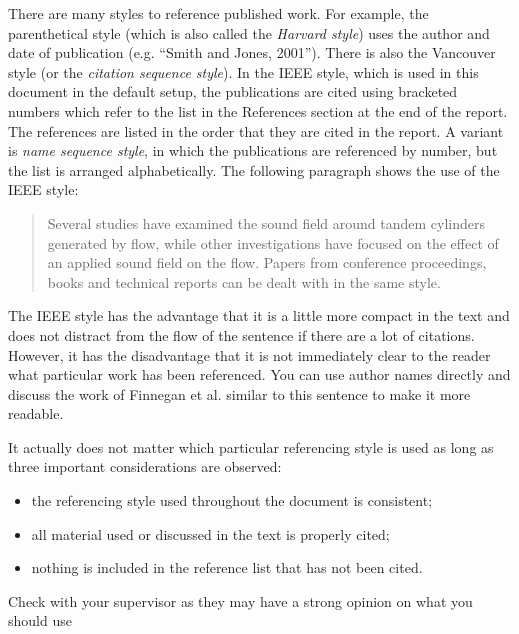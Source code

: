 There are many styles to reference published work. For example, the parenthetical style (which is also called the \emph{Harvard style}) uses the author and date of publication (e.g. ``Smith and Jones, 2001''). There is also the Vancouver style (or the \emph{citation sequence style}). In the IEEE style, which is used in this document in the default setup, the publications are cited using bracketed numbers which refer to the list in the References section at the end of the report. The references are listed in the order that they are cited in the report. A variant is \emph{name sequence style}, in which the publications are referenced by number, but the list is arranged alphabetically. The following paragraph shows the use of the IEEE style: 

\begin{quote}
Several studies have examined the sound field around tandem cylinders generated by flow\cite{fitzpatrick2003flow,finnegan2010experimental}, while other investigations have focused on the effect of an applied sound field on the flow\cite{hall2003vortex}. Papers from conference proceedings\cite{jordan2001array}, books\cite{paidoussis2010fluid} and technical reports\cite{reyes2007power} can be dealt with in the same style.
\end{quote}

The IEEE style has the advantage that it is a little more compact in the text and does not distract from the flow of the sentence if there are a lot of citations. However, it has the disadvantage that it is not immediately clear to the reader what particular work has been referenced. You can use author names directly and discuss the work of Finnegan et al. \cite{finnegan2010experimental} similar to this sentence to make it more readable. 

It actually does not matter which particular referencing style is used as long as three important considerations are observed:
\begin{itemize}
\item the referencing style used throughout the document is consistent;
\item all material used or discussed in the text is properly cited;
\item nothing is included in the reference list that has not been cited.
\end{itemize}

Check with your supervisor as they may have a strong opinion on what you should use

